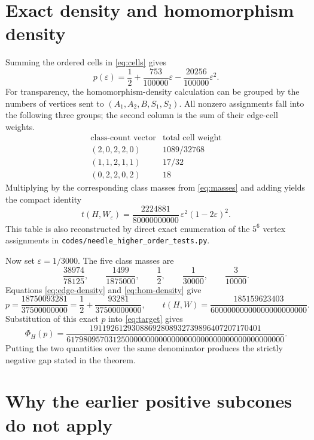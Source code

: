\documentclass[11pt]{article}
\begin{document}
\section{Exact density and homomorphism density}

Summing the ordered cells in \eqref{eq:cells} gives
\begin{equation}
 p(\varepsilon)
 =\frac12+\frac{753}{100000}\varepsilon
 -\frac{20256}{100000}\varepsilon^2.
 \label{eq:edge-density}
\end{equation}
For transparency, the homomorphism-density calculation can be grouped by
the numbers of vertices sent to
$(A_1,A_2,B,S_1,S_2)$.  All nonzero assignments fall into the following
three groups; the second column is the sum of their edge-cell weights.
\[
\begin{array}{c|c}
\text{class-count vector}&\text{total cell weight}\\ \hline
(2,0,2,2,0)&1089/32768\\
(1,1,2,1,1)&17/32\\
(0,2,2,0,2)&18
\end{array}
\]
Multiplying by the corresponding class masses from \eqref{eq:masses} and
adding yields the compact identity
\begin{equation}
 t(H,W_\varepsilon)
 =\frac{2224881}{80000000000}\,
 \varepsilon^2(1-2\varepsilon)^2.
 \label{eq:hom-density}
\end{equation}
This table is also reconstructed by direct exact enumeration of the
$5^6$ vertex assignments in
\texttt{codes/needle\_higher\_order\_tests.py}.

Now set $\varepsilon=1/3000$.  The five class masses are
\[
 \frac{38974}{78125},\qquad
 \frac{1499}{1875000},\qquad
 \frac12,\qquad
 \frac1{30000},\qquad
 \frac3{10000}.
\]
Equations \eqref{eq:edge-density} and \eqref{eq:hom-density} give
\begin{equation}
 p=\frac{18750093281}{37500000000}
 =\frac12+\frac{93281}{37500000000},
 \qquad
 t(H,W)=\frac{185159623403}{60000000000000000000000}.
 \label{eq:witness-values}
\end{equation}
Substitution of this exact $p$ into \eqref{eq:target} gives
\[
 \Phi_H(p)=
 \frac{19119261293088692808932739896407207170401}
 {6179809570312500000000000000000000000000000000000000}.
\]
Putting the two quantities over the same denominator produces the strictly
negative gap stated in the theorem.

\section{Why the earlier positive subcones do not apply}
\end{document}
